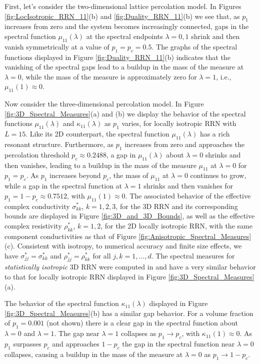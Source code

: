 \documentclass{cmslatex}
\begin{document}
First, let's consider the two-dimensional lattice percolation model. In
Figures \ref{fig:LocIsotropic_RRN_11}(b) and
\ref{fig:Duality_RRN_11}(b) we see that, as $p_1$ increases from zero 
and the system becomes increasingly connected, gaps in the spectral
function $\mu_{11}(\lambda)$ at the spectral endpoints $\lambda=0,1$ shrink and then
vanish  symmetrically at a value of $p_1=p_c=0.5$. The graphs of the
spectral functions displayed in Figure \ref{fig:Duality_RRN_11}(b)
indicates that the vanishing of the spectral gaps lead to a buildup in
the mass of the measure at $\lambda=0$, while the mass of the measure is
approximately zero for $\lambda=1$, i.e., $\mu_{11}(1)\approx0$.



Now consider the three-dimensional percolation model. In Figure
\ref{fig:3D_Spectral_Measures}(a) and (b) we display 
the behavior of the spectral functions $\mu_{11}(\lambda)$ and $\kappa_{11}(\lambda)$
as $p_1$ varies, for locally isotropic RRN with $L=15$. Like its
2D counterpart, the spectral function $\mu_{11}(\lambda)$ has a rich resonant
structure. Furthermore, as $p_1$ increases from zero and approaches
the percolation threshold $p_c\approx0.2488$, a gap in $\mu_{11}(\lambda)$ about
$\lambda=0$ shrinks and then vanishes, leading to a buildup in the mass of
the measure $\mu_{11}$ at $\lambda=0$ for 
$p_1=p_c$. As $p_1$ increases beyond $p_c$, the mass of $\mu_{11}$ at
$\lambda=0$ continues to grow, while a gap in the spectral function at $\lambda=1$ 
shrinks and then vanishes for $p_1=1-p_c\approx0.7512$, with
$\mu_{11}(1)\approx0$. The associated behavior of the effective complex
conductivity $\sigma^*_{kk}$, $k=1,2,3$, for the 3D 
RRN and its corresponding bounds are displayed in Figure
\ref{fig:3D_and_3D_Bounds}, as well as the effective complex
resistivity $\rho^*_{kk}$, $k=1,2$, for the 2D locally isotropic RRN,
with the same component conductivities as that of Figure
\ref{fig:Anisotropic_Spectral_Measures}(c). Consistent with isotropy,
to numerical accuracy and finite size effects, we have
$\sigma^*_{jj}=\sigma^*_{kk}$ and $\rho^*_{jj}=\rho^*_{kk}$ for all $j,k=1,\ldots,d$. The spectral measures for
\emph{statistically isotropic} 3D RRN  were computed in
\cite{Murphy:JMP:063506} and have a very similar behavior to that for
locally isotropic RRN displayed in Figure
\ref{fig:3D_Spectral_Measures}(a).    



The behavior of the spectral function $\kappa_{11}(\lambda)$ displayed in Figure
\ref{fig:3D_Spectral_Measures}(b) has a similar gap behavior. For a
volume fraction of $p_1=0.001$ (not shown) there is a clear gap in the
spectral function about $\lambda=0$ and $\lambda=1$. The gap near $\lambda=1$ collapses
as $p_1\to p_c$, with $\kappa_{11}(1)\approx0$. As $p_1$ surpasses $p_c$ and
approaches $1-p_c$ the gap in the spectral function near $\lambda=0$
collapses, causing a buildup in the mass of the measure at $\lambda=0$ as
$p_1\to1-p_c$. 
\end{document}
